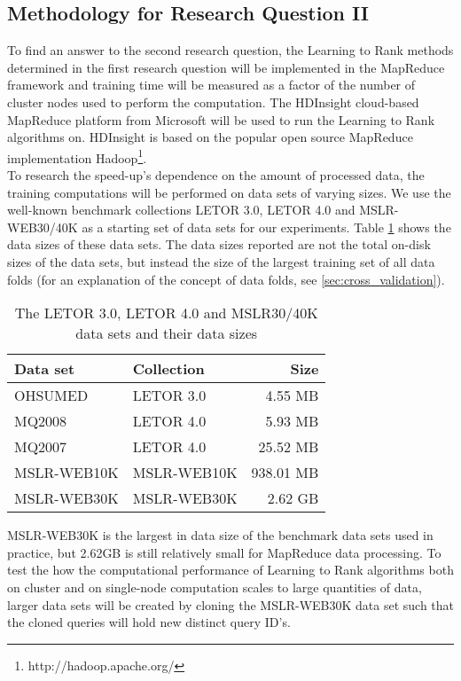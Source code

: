 \subsection{Methodology for Research Question II}
\label{ssec:rq2_methodology}
To find an answer to the second research question, the Learning to Rank methods determined in the first research question will be implemented in the MapReduce framework and training time will be measured as a factor of the number of cluster nodes used to perform the computation. The HDInsight cloud-based MapReduce platform from Microsoft will be used to run the Learning to Rank algorithms on. HDInsight is based on the popular open source MapReduce implementation Hadoop\footnote{http://hadoop.apache.org/}.\\

To research the speed-up's dependence on the amount of processed data, the training computations will be performed on data sets of varying sizes. We use the well-known benchmark collections LETOR 3.0, LETOR 4.0 and MSLR-WEB30/40K as a starting set of data sets for our experiments. Table \ref{tbl:initial_datasets} shows the data sizes of these data sets. The data sizes reported are not the total on-disk sizes of the data sets, but instead the size of the largest training set of all data folds (for an explanation of the concept of data folds, see \ref{sec:cross_validation}).

\begin{table}[!h]
\centering
\begin{tabular}{p{3.4cm}p{3.4cm}r}\toprule
Data set & Collection & Size \\
\midrule
OHSUMED     & LETOR 3.0       &   4.55 MB\\
MQ2008      & LETOR 4.0       &   5.93 MB\\
MQ2007      & LETOR 4.0       &  25.52 MB\\
MSLR-WEB10K & MSLR-WEB10K     & 938.01 MB\\
MSLR-WEB30K & MSLR-WEB30K     &   2.62 GB\\
\bottomrule
\end{tabular}
\caption{The LETOR 3.0, LETOR 4.0 and MSLR30/40K data sets and their data sizes}
\label{tbl:initial_datasets}
\end{table}

MSLR-WEB30K is the largest in data size of the benchmark data sets used in practice, but 2.62GB is still relatively small for MapReduce data processing. To test the how the computational performance of Learning to Rank algorithms both on cluster and on single-node computation scales to large quantities of data, larger data sets will be created by cloning the MSLR-WEB30K data set such that the cloned queries will hold new distinct query ID's.

